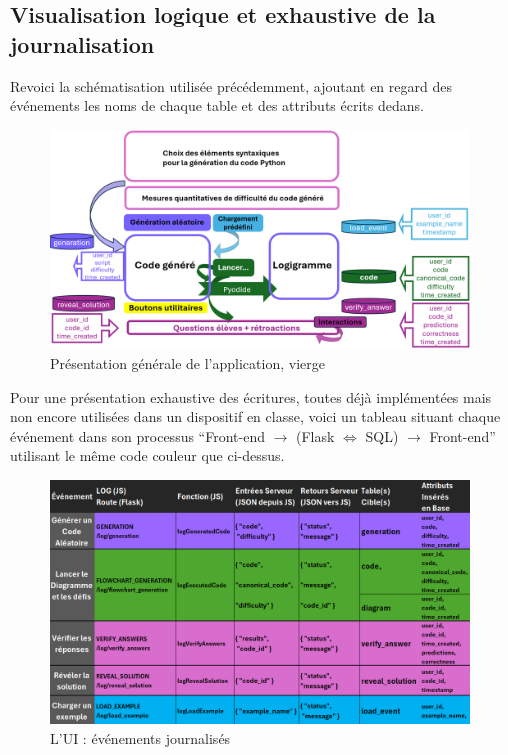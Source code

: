 \documentclass[11pt,a4paper]{article}
\begin{document}
\clearpage
\begin{minipage}{\textwidth}
    
\subsection{Visualisation logique et exhaustive de la journalisation}
Revoici la schématisation utilisée précédemment, ajoutant en regard des événements les noms de chaque table et des attributs écrits dedans.
\begin{figure}[H]
    \centering
    \includegraphics[width=0.99\textwidth, keepaspectratio]{logging_archi.png}
    \caption{Présentation générale de l'application, vierge}
    \label{fig:logging_archi}
\end{figure}
Pour une présentation exhaustive des écritures, toutes déjà implémentées mais non encore utilisées dans un dispositif en classe, voici un tableau situant chaque événement dans son processus ``Front-end $\rightarrow$ (Flask $\Leftrightarrow$ SQL) $\rightarrow$ Front-end'' utilisant le même code couleur que ci-dessus.
\begin{figure}[H]

    \centering
    \includegraphics[width=0.99\textwidth, keepaspectratio]{tableau_journalisations.png}
    \caption{L'UI : événements journalisés}
    \label{fig:tableau_journalisations}
\end{figure}

\end{minipage}
\end{document}
